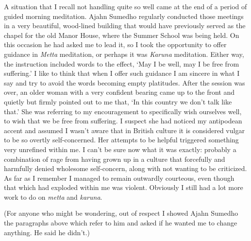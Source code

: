 A situation that I recall not handling quite so well came at the end of
a period of guided morning meditation. Ajahn Sumedho regularly conducted
those meetings in a very beautiful, wood-lined building that would have
previously served as the chapel for the old Manor House, where the
Summer School was being held. On this occasion he had asked me to lead
it, so I took the opportunity to offer guidance in \emph{Metta}
meditation, or perhaps it was \emph{Karuna} meditation. Either way, the
instruction included words to the effect, `May I be well, may I be free
from suffering.' I like to think that when I offer such guidance I am
sincere in what I say and try to avoid the words becoming empty
platitudes. After the session was over, an older woman with a very
confident bearing came up to the front and quietly but firmly pointed
out to me that, `In this country we don't talk like that.' She was
referring to my encouragement to specifically wish ourselves well, to
wish that we be free from suffering. I suspect she had noticed my
antipodean accent and assumed I wasn't aware that in British culture it
is considered vulgar to be so overtly self-concerned. Her attempts to be
helpful triggered something very unrefined within me. I can't be sure
now what it was exactly: probably a combination of rage from having
grown up in a culture that forcefully and harmfully denied wholesome
self-concern, along with not wanting to be criticized. As far as I
remember I managed to remain outwardly courteous, even though that which
had exploded within me was violent. Obviously I still had a lot more
work to do on \emph{metta} and \emph{karuna}.

(For anyone who might be wondering, out of respect I showed Ajahn
Sumedho the paragraphs above which refer to him and asked if he wanted
me to change anything. He said he didn't.)

